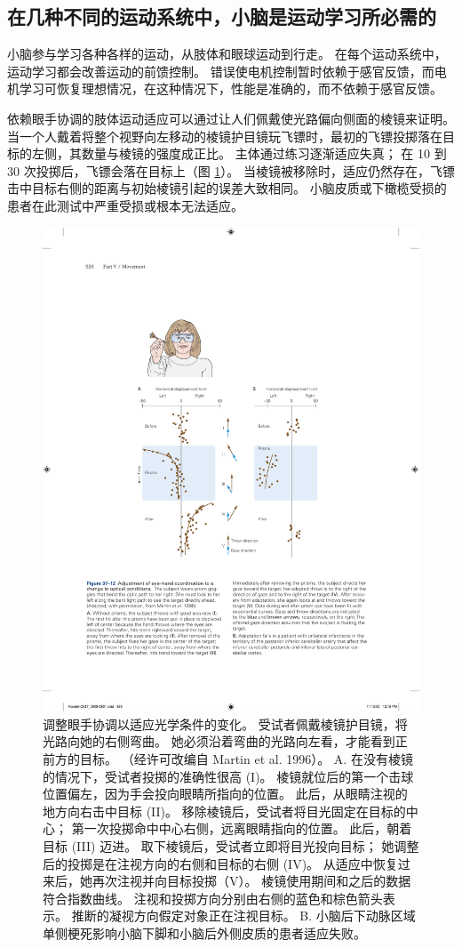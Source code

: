 \subsection{在几种不同的运动系统中，小脑是运动学习所必需的}

小脑参与学习各种各样的运动，从肢体和眼球运动到行走。 在每个运动系统中，运动学习都会改善运动的前馈控制。 错误使电机控制暂时依赖于感官反馈，而电机学习可恢复理想情况，在这种情况下，性能是准确的，而不依赖于感官反馈。

依赖眼手协调的肢体运动适应可以通过让人们佩戴使光路偏向侧面的棱镜来证明。 当一个人戴着将整个视野向左移动的棱镜护目镜玩飞镖时，最初的飞镖投掷落在目标的左侧，其数量与棱镜的强度成正比。 主体通过练习逐渐适应失真； 
在 10 到 30 次投掷后，飞镖会落在目标上（图 \ref{fig:37_12}）。 
当棱镜被移除时，适应仍然存在，飞镖击中目标右侧的距离与初始棱镜引起的误差大致相同。 小脑皮质或下橄榄受损的患者在此测试中严重受损或根本无法适应。

\begin{figure}[htbp]
	\centering
	\includegraphics[width=0.65\linewidth]{chap37/fig_37_12}
	\caption{调整眼手协调以适应光学条件的变化。 受试者佩戴棱镜护目镜，将光路向她的右侧弯曲。 她必须沿着弯曲的光路向左看，才能看到正前方的目标。 （经许可改编自 Martin et al. 1996）。 A. 在没有棱镜的情况下，受试者投掷的准确性很高 (I)。 棱镜就位后的第一个击球位置偏左，因为手会投向眼睛所指向的位置。 此后，从眼睛注视的地方向右击中目标 (II)。 移除棱镜后，受试者将目光固定在目标的中心； 第一次投掷命中中心右侧，远离眼睛指向的位置。 此后，朝着目标 (III) 迈进。 取下棱镜后，受试者立即将目光投向目标； 她调整后的投掷是在注视方向的右侧和目标的右侧 (IV)。 从适应中恢复过来后，她再次注视并向目标投掷（V）。 棱镜使用期间和之后的数据符合指数曲线。 注视和投掷方向分别由右侧的蓝色和棕色箭头表示。 推断的凝视方向假定对象正在注视目标。 B. 小脑后下动脉区域单侧梗死影响小脑下脚和小脑后外侧皮质的患者适应失败。}
	\label{fig:37_12}
\end{figure}

